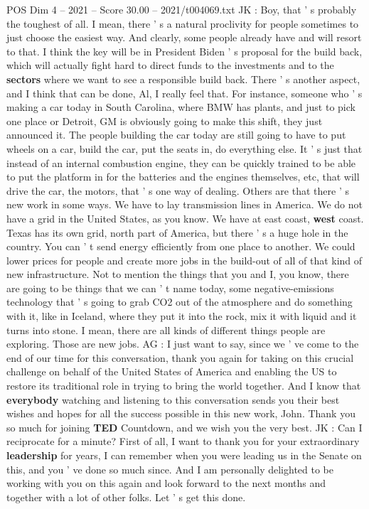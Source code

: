 \begin{textsample}{POS Dim 4 – 2021 – Score 30.00 – 2021/t004069.txt}
JK : Boy, that ' s probably the toughest of all.
I mean, there ' s a natural proclivity for people sometimes to just choose the easiest way.
And clearly, some people already have and will resort to that.
I think the key will be in President Biden ' s proposal for the build back, which will actually fight hard to direct funds to the investments and to the \textbf{sectors} where we want to see a responsible build back.
There ' s another aspect, and I think that can be done, Al, I really feel that.
For instance, someone who ' s making a car today in South Carolina, where BMW has plants, and just to pick one place or Detroit, GM is obviously going to make this shift, they just announced it.
The people building the car today are still going to have to put wheels on a car, build the car, put the seats in, do everything else.
It ' s just that instead of an internal combustion engine, they can be quickly trained to be able to put the platform in for the batteries and the engines themselves, etc, that will drive the car, the motors, that ' s one way of dealing.
Others are that there ' s new work in some ways.
We have to lay transmission lines in America.
We do not have a grid in the United States, as you know.
We have at east coast, \textbf{west} coast.
Texas has its own grid, north part of America, but there ' s a huge hole in the country.
You can ' t send energy efficiently from one place to another.
We could lower prices for people and create more jobs in the build-out of all of that kind of new infrastructure.
Not to mention the things that you and I, you know, there are going to be things that we can ' t name today, some negative-emissions technology that ' s going to grab CO2 out of the atmosphere and do something with it, like in Iceland, where they put it into the rock, mix it with liquid and it turns into stone.
I mean, there are all kinds of different things people are exploring.
Those are new jobs.
AG : I just want to say, since we ' ve come to the end of our time for this conversation, thank you again for taking on this crucial challenge on behalf of the United States of America and enabling the US to restore its traditional role in trying to bring the world together.
And I know that \textbf{everybody} watching and listening to this conversation sends you their best wishes and hopes for all the success possible in this new work, John.
Thank you so much for joining \textbf{TED} Countdown, and we wish you the very best.
JK : Can I reciprocate for a minute?
First of all, I want to thank you for your extraordinary \textbf{leadership} for years, I can remember when you were leading us in the Senate on this, and you ' ve done so much since.
And I am personally delighted to be working with you on this again and look forward to the next months and together with a lot of other folks.
Let ' s get this done.

\end{textsample}
